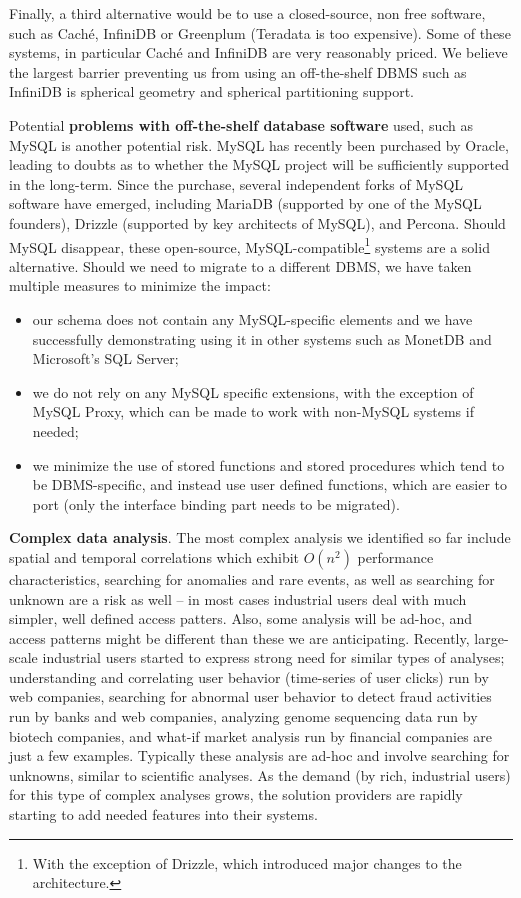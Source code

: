 \documentclass[DM,lsstdraft,toc]{lsstdoc}
\begin{document}
Finally, a third alternative would be to use a closed-source, non free
software, such as Caché, InfiniDB or Greenplum (Teradata is too
expensive). Some of these systems, in particular Caché and InfiniDB are
very reasonably priced. We believe the largest barrier preventing us
from using an off-the-shelf DBMS such as InfiniDB is spherical geometry
and spherical partitioning support.

Potential \textbf{problems with off-the-shelf database software} used,
such as MySQL is another potential risk. MySQL has recently been
purchased by Oracle, leading to doubts as to whether the MySQL project
will be sufficiently supported in the long-term. Since the purchase,
several independent forks of MySQL software have emerged, including
MariaDB (supported by one of the MySQL founders),
Drizzle \citep{Drizzle} (supported by key architects of
MySQL), and Percona. Should MySQL disappear, these open-source,
MySQL-compatible\footnote{With the exception of
  Drizzle, which introduced major changes to
  the architecture.} systems are a solid alternative. Should we need to
migrate to a different DBMS, we have taken multiple measures to minimize
the impact:

\begin{itemize}
\item
  our schema does not contain any MySQL-specific elements and we have
  successfully demonstrating using it in other systems such as MonetDB
  and Microsoft's SQL Server;
\item
  we do not rely on any MySQL specific extensions, with the exception of
  MySQL Proxy, which can be made to work with non-MySQL systems if
  needed;
\item
  we minimize the use of stored functions and stored procedures which
  tend to be DBMS-specific, and instead use user defined functions,
  which are easier to port (only the interface binding part needs to be
  migrated).
\end{itemize}

\textbf{Complex data analysis}. The most complex analysis we identified
so far include spatial and temporal correlations which exhibit
\(O(n^2)\) performance characteristics, searching for anomalies and rare
events, as well as searching for unknown are a risk as well -- in most
cases industrial users deal with much simpler, well defined access
patters. Also, some analysis will be ad-hoc, and access patterns might
be different than these we are anticipating. Recently, large-scale
industrial users started to express strong need for similar types of
analyses; understanding and correlating user behavior (time-series of
user clicks) run by web companies, searching for abnormal user behavior
to detect fraud activities run by banks and web companies, analyzing
genome sequencing data run by biotech companies, and what-if market
analysis run by financial companies are just a few examples. Typically
these analysis are ad-hoc and involve searching for unknowns, similar to
scientific analyses. As the demand (by rich, industrial users) for this
type of complex analyses grows, the solution providers are rapidly
starting to add needed features into their systems.
\end{document}
